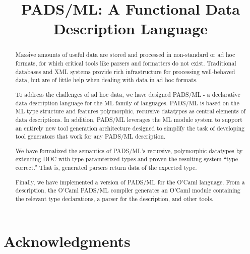 \documentclass[nocopyrightspace]{sigplanconf}
\begin{document}
\title{PADS/ML: A Functional Data Description Language}
       {}
       {}



\maketitle{}

\begin{abstract}  

  Massive amounts of useful data are stored and processed in
  non-standard or ad hoc formats, for which critical tools like
  parsers and formatters do not exist. Traditional databases and XML
  systems provide rich infrastructure for processing well-behaved
  data, but are of little help when dealing with data in ad hoc
  formats.
 
  To address the challenges of ad hoc data, we have designed PADS/ML -
  a declarative data description language for the ML family of
  languages. PADS/ML is based on the ML type structure and features
  polymorphic, recursive datatypes as central elements of data
  descriptions. In addition, PADS/ML leverages the ML module system to
  support an entirely new tool generation architecture designed to
  simplify the task of developing tool generators that work for any
  PADS/ML description.

  We have formalized the semantics of PADS/ML's recursive, polymorphic
  datatypes by extending DDC with type-paramterized types and proven
  the resulting system ``type-correct.'' That is, generated parsers
  return data of the expected type.

  Finally, we have implemented a version of PADS/ML for the O'Caml
  language.  From a description, the O'Caml PADS/ML compiler generates
  an O'Caml module containing the relevant type declarations, a parser
  for the description, and other tools.

\end{abstract}














\section*{Acknowledgments}






\end{document}
